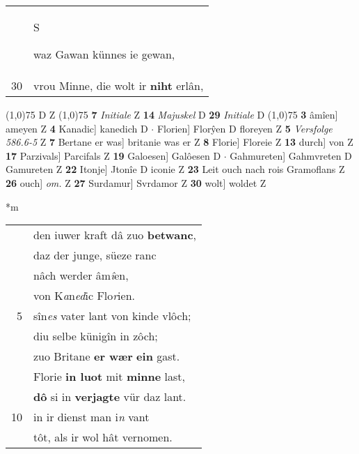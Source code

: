 \documentclass[8pt,a4paper,notitlepage]{article}
\begin{document}
\begin{table}[ht]
\begin{minipage}[t]{0.5\linewidth}
\begin{tabular}{rl}
 & \begin{large}S\end{large}waz Gawan künnes ie gewan,\\ 
30 & vrou Minne, die wolt ir \textbf{niht} erlân,\\ 
\end{tabular}
\scriptsize
\line(1,0){75} \newline
D Z \newline
\line(1,0){75} \newline
\textbf{7} \textit{Initiale} Z  \textbf{14} \textit{Majuskel} D  \textbf{29} \textit{Initiale} D  \newline
\line(1,0){75} \newline
\textbf{3} âmîen] ameyen Z \textbf{4} Kanadic] kanedich D  $\cdot$ Florien] Florŷen D floreyen Z \textbf{5} \textit{Versfolge 586.6-5} Z  \textbf{7} Bertane er was] britanie was er Z \textbf{8} Florie] Floreie Z \textbf{13} durch] von Z \textbf{17} Parzivals] Parcifals Z \textbf{19} Galoesen] Galôesen D  $\cdot$ Gahmureten] Gahmvreten D Gamureten Z \textbf{22} Itonje] Jtonîe D iconie Z \textbf{23} Leit ouch nach rois Gramoflans Z \textbf{26} ouch] \textit{om.} Z \textbf{27} Surdamur] Svrdamor Z \textbf{30} wolt] woldet Z \newline
\end{minipage}
\hspace{0.5cm}
\begin{minipage}[t]{0.5\linewidth}
\small
\begin{center}*m
\end{center}
\begin{tabular}{rl}
 & den iuwer kraft dâ zuo \textbf{betwanc},\\ 
 & daz der junge, süeze ranc\\ 
 & nâch werder âm\textit{î}en,\\ 
 & von K\textit{a}n\textit{ed}ic Flo\textit{r}ien.\\ 
5 & sîn\textit{es} vater lant von kinde  vlôch;\\ 
 & diu selbe künigîn in zôch;\\ 
 & zuo Britane \textbf{er wær} \textbf{ein} gast.\\ 
 & Florie \textbf{in luot} mit \textbf{minne} last,\\ 
 & \textbf{dô} si in \textbf{verjagte} vür daz lant.\\ 
10 & in ir dienst man i\textit{n} vant\\ 
 & tôt, als ir wol hât vernomen.\\ 

\end{tabular}
\end{minipage}
\end{table}
\end{document}
